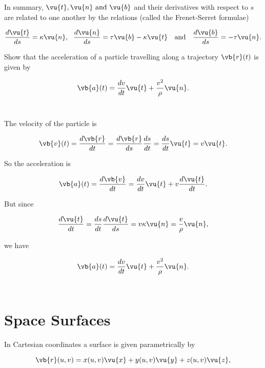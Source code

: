 \documentclass[english,a4paper,12pt]{report}
\begin{document}
In summary, \(\vu{t} , \vu{n} \text { and } \vu{b} \) and their derivatives with respect to \(s\) are related to one another by the relations (called the Frenet-Serret formulae) 

\begin{equation}
	\frac{d \vu{t} }{ds} = \kappa \vu{n} , ~~\frac{d \vu{n} }{ds} = \tau \vu{b} - \kappa \vu{t}~~ \text { and } ~~\frac{d \vu{b} }{ds} = -\tau \vu{n} .  
\end{equation}

{Show that the acceleration of a particle travelling along a trajectory \(\vb{r} (t)\) is given by 

\begin{equation}
	\vb{a} (t) = \frac{dv}{dt} \vu{t} + \frac{v^2}{\rho } \vu{n} .  
\end{equation}
~
}
{The velocity of the particle is 

\begin{equation}
	\vb{v} (t) = \frac{d \vb{r} }{dt} = \frac{d\vb{r} }{ds} \frac{ds}{dt} = \frac{ds}{dt} \vu{t} = v \vu{t} .   
\end{equation}

So the acceleration is 

\begin{equation}
	\vb{a} (t) = \frac{d\vb{v} }{dt} = \frac{dv}{dt} \vu{t} + v \frac{d \vu{t} }{dt}.   
\end{equation}

But since 

\begin{equation}
	\frac{d \vu{t} }{dt} = \frac{ds}{dt} \frac{d \vu{t} }{ds} = v \kappa \vu{n} = \frac{v}{\rho }\vu{n},   
\end{equation}

we have

\begin{equation}
	\vb{a} (t) = \frac{dv}{dt} \vu{t} + \frac{v^2}{\rho }\vu{n} .  
\end{equation}
~
}

\section{Space Surfaces}

In Cartesian coordinates a surface is given parametrically by 

\begin{equation}
	\vb{r} (u,v)  = x(u,v) \vu{x} + y(u,v) \vu{y} + z(u,v) \vu{z},
\end{equation}
\end{document}
